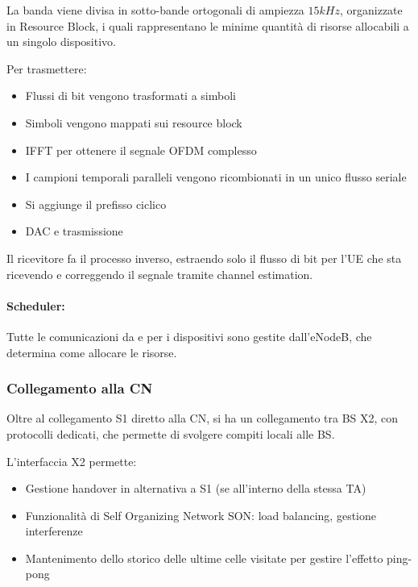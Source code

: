 La banda viene divisa in sotto-bande ortogonali di ampiezza $15kHz$, organizzate in Resource Block, i quali rappresentano le minime quantità di risorse allocabili a un singolo dispositivo.

Per trasmettere: 
\begin{itemize}
    \item Flussi di bit vengono trasformati a simboli
    
    \item Simboli vengono mappati sui resource block
    
    \item IFFT per ottenere il segnale OFDM complesso 
    
    \item I campioni temporali paralleli vengono ricombionati in un unico flusso seriale
    
    \item Si aggiunge il prefisso ciclico 
    
    \item DAC e trasmissione
\end{itemize}

Il ricevitore fa il processo inverso, estraendo solo il flusso di bit per l'UE che sta ricevendo e correggendo il segnale tramite channel estimation. 

\paragraph{Scheduler:} Tutte le comunicazioni da e per i dispositivi sono gestite dall'eNodeB, che determina come allocare le risorse.

\subsubsection{Collegamento alla CN}

Oltre al collegamento S1 diretto alla CN, si ha un collegamento tra BS X2, con protocolli dedicati, che permette di svolgere compiti locali alle BS.

L'interfaccia X2 permette: 
\begin{itemize}
    \item Gestione handover in alternativa a S1 (se all'interno della stessa TA)
    
    \item Funzionalità di Self Organizing Network SON: load balancing, gestione interferenze 
    
    \item Mantenimento dello storico delle ultime celle visitate per gestire l'effetto ping-pong
\end{itemize}

